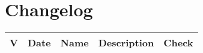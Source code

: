 \section*{Changelog} %

\begin{longtable}{
		>{\centering}p{}	%
		>{\centering}p{}	%
		>{\centering}p{}	%
		>{}p{}			%
		>{\centering}p{} }	%

	\textbf{\color{white}V} &
	\textbf{\color{white}Date} &
	\textbf{\color{white}Name} &
	\textbf{\color{white}Description} &
	\textbf{\color{white}Check}
	\tabularnewline
	\endhead


\end{longtable}
